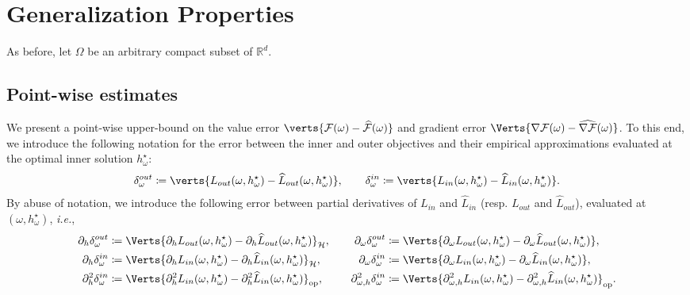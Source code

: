 \section{Generalization Properties}\label{app:sec_conv}

{As before, let $\Omega$ be an arbitrary compact subset of $\mathbb{R}^d$.}

\subsection{Point-wise estimates}\label{app:subsec_point_est}
We present a point-wise upper-bound on the value error $\verts{\mathcal{F}(\omega)-\widehat{\mathcal{F}}(\omega) }$ and gradient error $\Verts{\nabla\mathcal{F}(\omega)-\widehat{\nabla\mathcal{F}}(\omega) }$. To this end, we introduce the following notation for the error between the inner and outer objectives and their empirical approximations evaluated at the optimal inner solution $h_{\omega}^{\star}$: 
\begin{align*}
    \Dout\coloneqq \verts{L_{out}(\omega, h^\star_\omega)-\widehat{L}_{out}(\omega, h^\star_\omega)}, 
    \qquad 
    \Din \coloneqq \verts{L_{in}(\omega, h^\star_\omega)-\widehat{L}_{in}(\omega, h^\star_\omega)}.
\end{align*}
By abuse of notation, we introduce the following error between  partial derivatives of $L_{in}$ and $\widehat{L}_{in}$ (resp. $L_{out}$ and $\widehat{L}_{out}$), evaluated at $(\omega, h_{\omega}^{\star})$, \textit{i.e.},
\begin{align*}
  \Douth &\coloneqq \Verts{\partial_h L_{out}(\omega, h^\star_\omega)-\partial_h\widehat{L}_{out}(\omega, h^\star_\omega)}_{\mathcal{H}},\quad 
  &\Doutw &\coloneqq \Verts{\partial_\omega L_{out}(\omega, h^\star_\omega)-\partial_\omega\widehat{L}_{out}(\omega, h^\star_\omega)},\\
  \Dinh &\coloneqq \Verts{\partial_h L_{in}(\omega, h^\star_\omega)-\partial_h\widehat{L}_{in}(\omega, h^\star_\omega)}_{\mathcal{H}},\quad 
  &\Dinw &\coloneqq \Verts{\partial_\omega L_{in}(\omega, h^\star_\omega)-\partial_\omega\widehat{L}_{in}(\omega, h^\star_\omega)},\\
  \Dinhh &\coloneqq \Verts{\partial_{h}^2 L_{in}(\omega, h^\star_\omega)-\partial_h^2\widehat{L}_{in}(\omega, h^\star_\omega)}_{\op},\quad 
  &\Dinwh &\coloneqq \Verts{\partial_{\omega,h}^2 L_{in}(\omega, h^\star_\omega)-\partial_{\omega,h}^2\widehat{L}_{in}(\omega, h^\star_\omega)}_{\op}.
\end{align*}

